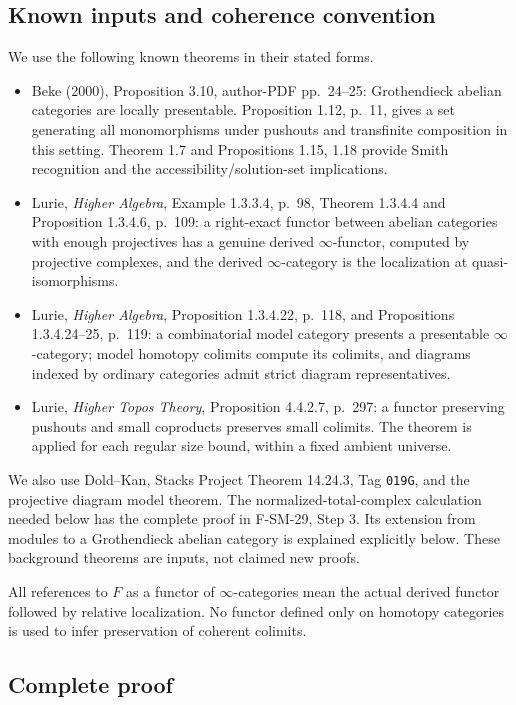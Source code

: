\documentclass[11pt,a4paper]{article}
\theoremstyle{definition}\newtheorem{definition}[theorem]{Definition}
\theoremstyle{remark}\newtheorem{remark}[theorem]{Remark}
\begin{document}
\subsection{Known inputs and coherence convention}
We use the following known theorems in their stated forms.
\begin{itemize}
\item Beke (2000), Proposition 3.10, author-PDF pp.~24--25:
Grothendieck abelian categories are locally presentable.
Proposition 1.12, p.~11, gives a set generating all monomorphisms
under pushouts and transfinite composition in this setting.
Theorem 1.7 and Propositions 1.15, 1.18 provide Smith recognition
and the accessibility/solution-set implications.
\item Lurie, \emph{Higher Algebra}, Example 1.3.3.4, p.~98,
Theorem 1.3.4.4 and Proposition 1.3.4.6, p.~109:
a right-exact functor between
abelian categories with enough projectives has a genuine derived
\(\infty\)-functor, computed by projective complexes, and the
derived \(\infty\)-category is the localization at quasi-isomorphisms.
\item Lurie, \emph{Higher Algebra}, Proposition 1.3.4.22,
p.~118, and Propositions 1.3.4.24--25, p.~119: a combinatorial
model category presents a presentable \(\infty\)-category;
model homotopy colimits compute its colimits, and diagrams
indexed by ordinary categories admit strict diagram representatives.
\item Lurie, \emph{Higher Topos Theory}, Proposition 4.4.2.7,
p.~297: a functor preserving pushouts and small coproducts
preserves small colimits.  The theorem is applied for each
regular size bound, within a fixed ambient universe.
\end{itemize}
We also use Dold--Kan, Stacks Project Theorem 14.24.3,
Tag \nolinkurl{019G}, and the projective diagram model theorem.
The normalized-total-complex calculation needed below has the
complete proof in F-SM-29, Step 3.  Its extension from modules to
a Grothendieck abelian category is explained explicitly below.
These background theorems are inputs, not claimed new proofs.

All references to \(F\) as a functor of \(\infty\)-categories
mean the actual derived functor followed by relative localization.
No functor defined only on homotopy categories is used to infer
preservation of coherent colimits.

\subsection{Complete proof}
\end{document}
